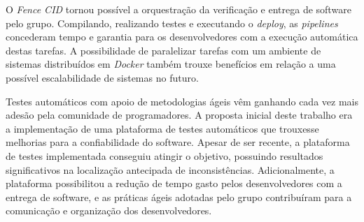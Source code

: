 O \emph{Fence CID} tornou possível a orquestração da verificação e entrega de software pelo grupo. Compilando, realizando testes e executando o \emph{deploy}, as \emph{pipelines} concederam tempo e garantia para os desenvolvedores com a execução automática destas tarefas. A possibilidade de paralelizar tarefas com um ambiente de sistemas distribuídos em \emph{Docker} também trouxe benefícios em relação a uma possível escalabilidade de sistemas no futuro.

Testes automáticos com apoio de metodologias ágeis vêm ganhando cada vez mais adesão pela comunidade de programadores. A proposta inicial deste trabalho era a implementação de uma plataforma de testes automáticos que trouxesse melhorias para a confiabilidade do software. Apesar de ser recente, a plataforma de testes implementada conseguiu atingir o objetivo, possuindo resultados significativos na localização antecipada de inconsistências. Adicionalmente, a plataforma possibilitou a redução de tempo gasto pelos desenvolvedores com a entrega de software, e as práticas ágeis adotadas pelo grupo contribuíram para a comunicação e organização dos desenvolvedores.